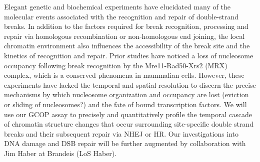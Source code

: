 {}
Elegant genetic and biochemical experiments have elucidated many of the molecular events associated with the recognition and repair of  double-strand breaks\citep{Haber2016-ca,Lieber2010-cl,Renkawitz2014-jz,Jasin2013-fv}.  In addition to the factors required for break recognition, processing and repair via homologous recombination or non-homologous end joining, the local chromatin environment also influences the accessibility of the break site
and the kinetics of recognition and repair\citep{Price2013-lp,Smerdon1991-sv}. Prior studies have noticed a loss of nucleosome occupancy following break recognition by the Mre11-Rad50-Xrs2 (MRX) complex\citep{Tsukuda2005-bm}, which is a conserved phenomena in mammalian cells\citep{Berkovich2007-it,Goldstein2013-kb}. However, these experiments have lacked the temporal and spatial resolution to discern the precise mechanisms by which nucleosome organization and occupancy are lost (\eg eviction or sliding of nucleosomes?) and the fate of bound transcription factors.  We will use our GCOP assay to precisely and quantitatively profile the temporal cascade of chromatin structure changes that occur surrounding site-specific double strand breaks and their subsequent repair via NHEJ or HR. Our investigations into DNA damage and DSB repair will be further augmented by collaboration with Jim Haber at Brandeis (LoS Haber). %


